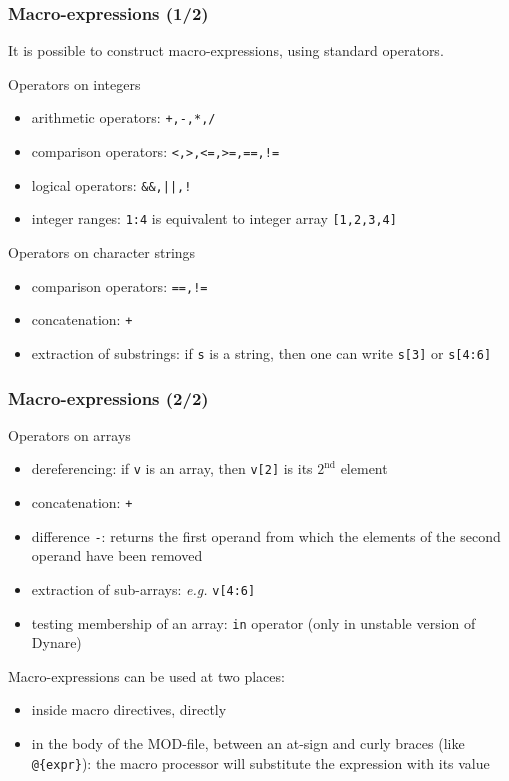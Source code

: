 \documentclass{beamer}
\begin{document}
\begin{frame}[fragile=singleslide]
  \frametitle{Macro-expressions (1/2)}
  It is possible to construct macro-expressions, using standard operators.
  \begin{block}{Operators on integers}
    \begin{itemize}
    \item arithmetic operators: \texttt{+,-,*,/}
    \item comparison operators: \texttt{<,>,<=,>=,==,!=}
    \item logical operators: \verb+&&,||,!+
    \item integer ranges: \texttt{1:4} is equivalent to integer array \texttt{[1,2,3,4]}
    \end{itemize}
  \end{block}

  \begin{block}{Operators on character strings}
    \begin{itemize}
    \item comparison operators: \texttt{==,!=}
    \item concatenation: \texttt{+}
    \item extraction of substrings: if \texttt{s} is a string, then one can write \texttt{s[3]} or \texttt{s[4:6]}
    \end{itemize}
  \end{block}
\end{frame}

\begin{frame}[fragile=singleslide]
  \frametitle{Macro-expressions (2/2)}
  \begin{block}{Operators on arrays}
    \begin{itemize}
    \item dereferencing: if \texttt{v} is an array, then \texttt{v[2]} is its $2^{\textrm{nd}}$ element
    \item concatenation: \texttt{+}
    \item difference \texttt{-}: returns the first operand from which the elements of the second operand have been removed
    \item extraction of sub-arrays: \textit{e.g.} \texttt{v[4:6]}
    \item testing membership of an array: \texttt{in} operator (only in unstable version of Dynare)
    \end{itemize}
  \end{block}

  Macro-expressions can be used at two places:
  \begin{itemize}
  \item inside macro directives, directly
  \item in the body of the MOD-file, between an at-sign and curly braces (like \verb+@{expr}+): the macro processor will substitute the expression with its value
  \end{itemize}
\end{frame}
\end{document}
